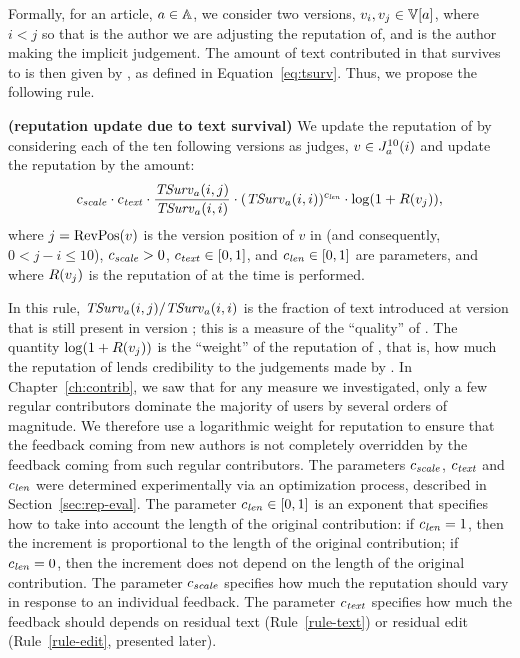 Formally, for an article, $a \in \mathbb{A}$,
we consider two versions, $\version{i}, \version{j} \in \versions{a}$,
where $i < j$ so that  is the author we are
adjusting the reputation of, and  is the author
making the implicit judgement.
The amount of text contributed in  that survives
to  is then given by , as defined in
Equation~\ref{eq:tsurv}.
Thus, we propose the following rule.

\begin{regola}
\textbf{(reputation update due to text survival)}
\label{rule-text}
  We update the reputation of  by considering
  each of the ten following versions as judges,
  $v \in J_{a}^{10}(i)$ and update the reputation by the amount:
  \[
    {c_{{\text{\textit{scale}}}}} \cdot {c_{{\text{\textit{text}}}}} \cdot \frac{\mathit{TSurv}_{a}(i,j)}{\mathit{TSurv}_{a}(i,i)} 
    \cdot (\mathit{TSurv}_{a}(i,i))^{c_{{\text{\textit{len}}}}} \cdot \log(1 + R(v_{j})),
  \]
  where $j = \mathrm{RevPos}(v)$ is the version position of $v$ in 
  (and consequently, $0 < j - i \le 10$),
  ${c_{{\text{\textit{scale}}}}} > 0$, ${c_{{\text{\textit{text}}}}} \in [0,1]$, and ${c_{{\text{\textit{len}}}}} \in
  [0,1]$ are parameters, and where $R(v_{j})$ is the reputation of
   at the time  is performed.
\end{regola}

\noindent
In this rule, $\mathit{TSurv}_{a}(i,j) / \mathit{TSurv}_{a}(i,i)$ is the fraction of text
introduced at version  that is still present in version ;
this is a measure of the ``quality'' of . 
The quantity $\log(1 + R(v_{j}))$ is the ``weight'' of the
reputation of ,
that is, how much the reputation of  lends
credibility to the judgements made by . 
In Chapter~\ref{ch:contrib}, we saw that for any measure we investigated,
only a few regular contributors dominate the majority of users by
several orders of magnitude.
We therefore use a logarithmic weight for reputation
to ensure that the feedback coming from new authors is not completely
overridden by the feedback coming from such regular contributors. 
The parameters ${c_{{\text{\textit{scale}}}}}$, ${c_{{\text{\textit{text}}}}}$ and ${c_{{\text{\textit{len}}}}}$ were
determined experimentally via an optimization process, described
in Section~\ref{sec:rep-eval}.
The parameter ${c_{{\text{\textit{len}}}}} \in [0,1]$ is an exponent that specifies how
to take into account the length of the original contribution: if
${c_{{\text{\textit{len}}}}} = 1$, then the increment is proportional to the length of
the original contribution; if ${c_{{\text{\textit{len}}}}} = 0$, then the increment
does not depend on the length of the original contribution.
The parameter ${c_{{\text{\textit{scale}}}}}$ specifies how much the reputation should
vary in response to an individual feedback. 
The parameter ${c_{{\text{\textit{text}}}}}$ specifies how much the feedback should 
depends on residual text (Rule~\ref{rule-text}) or residual edit
(Rule~\ref{rule-edit}, presented later). 

